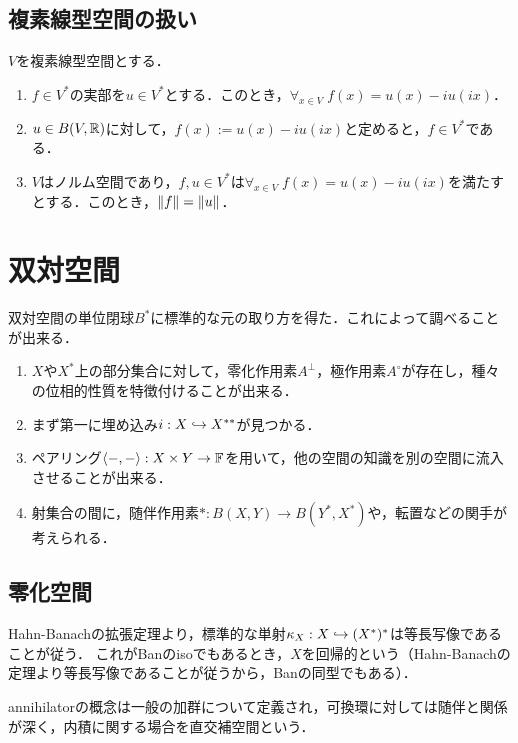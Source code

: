 \documentclass[uplatex,dvipdfmx]{jsreport}
\begin{document}
\subsection{複素線型空間の扱い}

\begin{proposition}[複素線型空間は実線形空間]
    $V$を複素線型空間とする．
    \begin{enumerate}
        \item $f\in V^*$の実部を$u\in V^*$とする．このとき，$\forall_{x\in V}\;f(x)=u(x)-iu(ix)$．
        \item $u\in B(V,\mathbb{R})$に対して，$f(x):=u(x)-iu(ix)$と定めると，$f\in V^*$である．
        \item $V$はノルム空間であり，$f,u\in V^*$は$\forall_{x\in V}\;f(x)=u(x)-iu(ix)$を満たすとする．このとき，$\|f\|=\|u\|$．
    \end{enumerate}
\end{proposition}

\section{双対空間}

\begin{tcolorbox}[colframe=ForestGreen, colback=ForestGreen!10!white,breakable,colbacktitle=ForestGreen!40!white,coltitle=black,fonttitle=\bfseries\sffamily,
title=]
    双対空間の単位閉球$B^*$に標準的な元の取り方を得た．これによって調べることが出来る．
    \begin{enumerate}
        \item $X$や$X^*$上の部分集合に対して，零化作用素$A^\perp$，極作用素$A^\circ$が存在し，種々の位相的性質を特徴付けることが出来る．
        \item まず第一に埋め込み$i:X\hookrightarrow X^{**}$が見つかる．
        \item ペアリング$\langle-,-\rangle:X\times Y\to\mathbb{F}$を用いて，他の空間の知識を別の空間に流入させることが出来る．
        \item 射集合の間に，随伴作用素$*:B(X,Y)\to B(Y^*,X^*)$や，転置などの関手が考えられる．
    \end{enumerate}
\end{tcolorbox}

\subsection{零化空間}

\begin{tcolorbox}[colframe=ForestGreen, colback=ForestGreen!10!white,breakable,colbacktitle=ForestGreen!40!white,coltitle=black,fonttitle=\bfseries\sffamily,
title=自然なペアリングに関する直交空間]
    Hahn-Banachの拡張定理より，標準的な単射$\kappa_X:X\hookrightarrow (X^*)^*$は等長写像であることが従う．
    これがBanのisoでもあるとき，$X$を回帰的という（Hahn-Banachの定理より等長写像であることが従うから，Banの同型でもある）．

    annihilatorの概念は一般の加群について定義され，可換環に対しては随伴と関係が深く，内積に関する場合を直交補空間という．
\end{tcolorbox}
\end{document}
